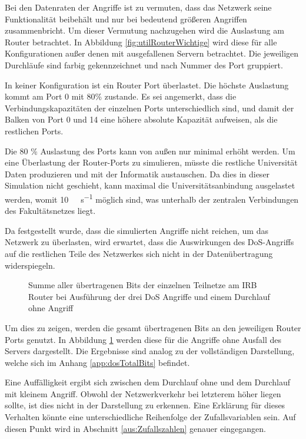 Bei den Datenraten der Angriffe ist zu vermuten, dass das Netzwerk seine Funktionalität beibehält und nur bei bedeutend größeren Angriffen zusammenbricht. Um dieser Vermutung nachzugehen wird die Auslastung am Router betrachtet. In Abbildung \ref{fig:utilRouterWichtige} wird diese für alle Konfigurationen außer denen mit ausgefallenen Servern betrachtet. Die jeweiligen Durchläufe sind farbig gekennzeichnet und nach Nummer des Port gruppiert. 

In keiner Konfiguration ist ein Router Port überlastet. Die höchste Auslastung kommt am Port 0 mit 80\% zustande. Es sei angemerkt, dass die Verbindungskapazitäten der einzelnen Ports unterschiedlich sind, und damit der Balken von Port 0 und 14 eine höhere absolute Kapazität aufweisen, als die restlichen Ports.

Die 80 \% Auslastung des Ports kann von außen nur minimal erhöht werden. Um eine Überlastung der Router-Ports zu simulieren, müsste die restliche Universität Daten produzieren und mit der Informatik austauschen. Da dies in dieser Simulation nicht geschieht, kann maximal die Universitätsanbindung ausgelastet werden, womit \SI{10}{\giga\bit\per\second} möglich sind, was unterhalb der zentralen Verbindungen des Fakultätsnetzes liegt.

Da festgestellt wurde, dass die simulierten Angriffe nicht reichen, um das Netzwerk zu überlasten, wird erwartet, dass die Auswirkungen des DoS-Angriffs auf die restlichen Teile des Netzwerkes sich nicht in der Datenübertragung widerspiegeln.

\begin{figure}[ht]
	\centering
	
	\caption[Summe der übertragenen Bits der jeweiligen Teilnetze]{Summe aller übertragenen Bits der einzelnen Teilnetze am IRB Router bei Ausführung der drei DoS Angriffe und einem Durchlauf ohne Angriff}
	\label{fig:totalBitsWichtige}
\end{figure}

Um dies zu zeigen, werden die gesamt übertragenen Bits an den jeweiligen Router Ports genutzt. In Abbildung \ref{fig:totalBitsWichtige} werden diese für die Angriffe ohne Ausfall des Servers dargestellt. Die Ergebnisse sind analog zu der vollständigen Darstellung, welche sich im Anhang \ref{app:dosTotalBits} befindet.

Eine Auffälligkeit ergibt sich zwischen dem Durchlauf ohne und dem Durchlauf mit kleinem Angriff. Obwohl der Netzwerkverkehr bei letzterem höher liegen sollte, ist dies nicht in der Darstellung zu erkennen. Eine Erklärung für dieses Verhalten könnte eine unterschiedliche Reihenfolge der Zufallsvariablen sein. Auf diesen Punkt wird in Abschnitt \ref{aus:Zufallszahlen} genauer eingegangen.

